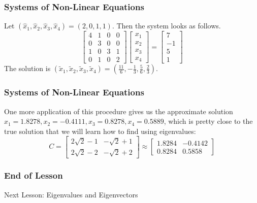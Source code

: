 \documentclass[xcolor=dvipsnames]{beamer}
\begin{document}
\begin{frame}
  \frametitle{Systems of Non-Linear Equations}
  Let $(\hat{x}_{1},\hat{x}_{2},\hat{x}_{3},\hat{x}_{4})=(2,0,1,1)$. Then the system looks as
  follows.
  \begin{equation}
    \label{eq:eipoghoo}
    \left[
      \begin{array}{cccc}
4 & 1 & 0 & 0 \\
0 & 3 & 0 & 0 \\
1 & 0 & 3 & 1 \\
0 & 1 & 0 & 2
      \end{array}\right]\left[
      \begin{array}{c}
        x_{1} \\
        x_{2} \\
        x_{3} \\
        x_{4}
      \end{array}\right]=\left[
      \begin{array}{c}
        7     \\
        -1     \\
        5     \\
        1
      \end{array}\right]
  \end{equation}
The solution is $(\tilde{x}_{1},\tilde{x}_{2},\tilde{x}_{3},\tilde{x}_{4})=(\frac{11}{6},-\frac{1}{3},\frac{5}{6},\frac{2}{3})$.
\end{frame}

\begin{frame}
  \frametitle{Systems of Non-Linear Equations}
  One more application of this procedure gives us the approximate
  solution $x_{1}=1.8278,x_{2}=-0.4111,x_{3}=0.8278,x_{4}=0.5889$,
  which is pretty close to the true solution that we will learn how to
  find using eigenvalues:
  \begin{equation}
    \label{eq:ohnohfee}
    C=\left[
      \begin{array}{cc}
        2\sqrt{2}-1&-\sqrt{2}+1 \\
        2\sqrt{2}-2&-\sqrt{2}+2
      \end{array}\right]\approx\left[
      \begin{array}{cc}
        1.8284&-0.4142\\
        0.8284&0.5858
      \end{array}\right]
  \end{equation}
\end{frame}

\begin{frame}
  \frametitle{End of Lesson}
Next Lesson: Eigenvalues and Eigenvectors
\end{frame}
\end{document}
